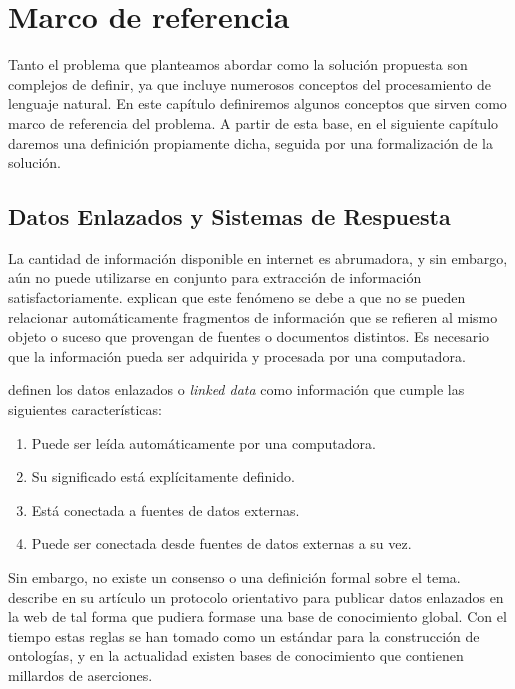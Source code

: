 
\chapter{Marco de referencia}

Tanto el problema que planteamos abordar como la solución propuesta son complejos de definir, ya que incluye numerosos conceptos del procesamiento de lenguaje natural. En este capítulo definiremos algunos conceptos que sirven como marco de referencia del problema. A partir de esta base, en el siguiente capítulo daremos una definición propiamente dicha, seguida por una formalización de la solución.

\section{Datos Enlazados y Sistemas de Respuesta}

La cantidad de información disponible en internet es abrumadora, y sin embargo, aún no puede utilizarse en conjunto para extracción de información satisfactoriamente. \citet{BernersLeeLinkedDataGuide} explican que este fenómeno se debe a que no se pueden relacionar automáticamente fragmentos de información que se refieren al mismo objeto o suceso que provengan de fuentes o documentos distintos. Es necesario que la información pueda ser adquirida y procesada por una computadora.

\citet{BizerLinkedData} definen los datos enlazados o \textit{linked data} como información que cumple las siguientes características:
\begin{enumerate}
    \item Puede ser leída automáticamente por una computadora.
    \item Su significado está explícitamente definido.
    \item Está conectada a fuentes de datos externas.
    \item Puede ser conectada desde fuentes de datos externas a su vez.
\end{enumerate}

Sin embargo, no existe un consenso o una definición formal sobre el tema. \citet{BernersLeeLinkedDataGuide} describe en su artículo un protocolo orientativo para publicar datos enlazados en la web de tal forma que pudiera formase una base de conocimiento global. Con el tiempo estas reglas se han tomado como un estándar para la construcción de ontologías, y en la actualidad existen bases de conocimiento que contienen millardos de aserciones.

